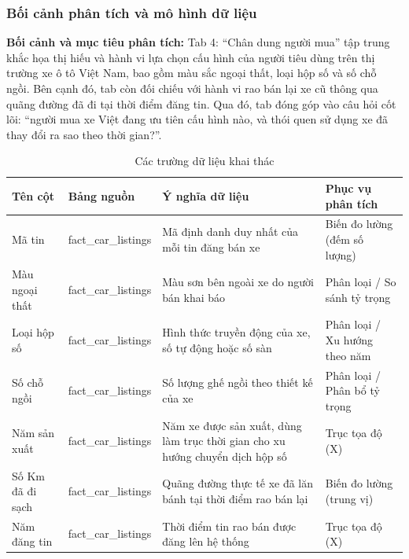 \subsubsection{Bối cảnh phân tích và mô hình dữ liệu}
\label{subsubsec:tab4_schema}

\noindent\textbf{Bối cảnh và mục tiêu phân tích:}
Tab 4: ``Chân dung người mua'' tập trung khắc họa thị hiếu và hành vi lựa chọn cấu hình của người tiêu dùng trên thị trường xe ô tô Việt Nam, bao gồm màu sắc ngoại thất, loại hộp số và số chỗ ngồi. Bên cạnh đó, tab còn đối chiếu với hành vi rao bán lại xe cũ thông qua quãng đường đã đi tại thời điểm đăng tin. Qua đó, tab đóng góp vào câu hỏi cốt lõi: ``người mua xe Việt đang ưu tiên cấu hình nào, và thói quen sử dụng xe đã thay đổi ra sao theo thời gian?''.

\begin{table}[H]
\centering
\small
\begin{tabular}{p{3cm} p{3.5cm} p{4cm} p{3.5cm}}
\textbf{Tên cột} & \textbf{Bảng nguồn} & \textbf{Ý nghĩa dữ liệu} & \textbf{Phục vụ phân tích} \\ \hline
Mã tin & fact\_car\_listings & Mã định danh duy nhất của mỗi tin đăng bán xe & Biến đo lường (đếm số lượng) \\
Màu ngoại thất & fact\_car\_listings & Màu sơn bên ngoài xe do người bán khai báo & Phân loại / So sánh tỷ trọng \\
Loại hộp số & fact\_car\_listings & Hình thức truyền động của xe, số tự động hoặc số sàn & Phân loại / Xu hướng theo năm \\
Số chỗ ngồi & fact\_car\_listings & Số lượng ghế ngồi theo thiết kế của xe & Phân loại / Phân bổ tỷ trọng \\
Năm sản xuất & fact\_car\_listings & Năm xe được sản xuất, dùng làm trục thời gian cho xu hướng chuyển dịch hộp số & Trục tọa độ (X) \\
Số Km đã đi sạch & fact\_car\_listings & Quãng đường thực tế xe đã lăn bánh tại thời điểm rao bán lại & Biến đo lường (trung vị) \\
Năm đăng tin & fact\_car\_listings & Thời điểm tin rao bán được đăng lên hệ thống & Trục tọa độ (X) \\
\end{tabular}
\caption{Các trường dữ liệu khai thác}
\label{tab:schema_tab4}
\end{table}

